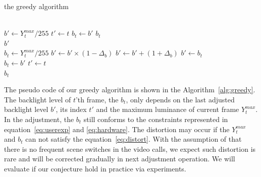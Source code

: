 
\begin{algorithm}
  \caption{the greedy algorithm}
  \label{alg:greedy}
  \begin{algorithmic}[1]
    \\
      \State $b' \gets Y_{t}^{max} / 255$
      \State $t' \gets t$
      \State $b_t \gets b'$
      \Return $b_t$
    \EndIf
      \\
      \Return $b'$
    \EndIf
    \\

    \State $b_{t} \gets Y_{t}^{max} / 255$
      \State $b' \gets b' \times (1 - \Delta_{b})$
      \State $b' \gets b' + (1 + \Delta_{b})$
    \Else
      \State $b' \gets b_t$
    \EndIf
    \\
    \State $b_{t} \gets b'$
    \State $t' \gets t$
\\
    \Return $b_{t}$
  \end{algorithmic}
\end{algorithm}

The pseudo code of 
our greedy algorithm is shown in the
Algorithm~\ref{alg:greedy}. The backlight level of $t$'th frame, the
$b_t$, only depends on the last adjusted backlight level $b'$, its
index $t'$ and the maximum luminance of current frame $Y_t^{max}$. In
the adjustment, the $b_t$ still conforms to the constraints represented
in equation~\ref{eq:userexp} and \ref{eq:hardware}. The distortion may
occur if the $Y_t^{max}$ and $b_t$ can not satisfy the
equation~\ref{eq:distort}. With the assumption of that there is no
frequent scene switches in the video calls, we expect such distortion
is rare and will be
corrected gradually in next adjustment operation. We will evaluate if
our conjecture hold in practice via experiments. 







